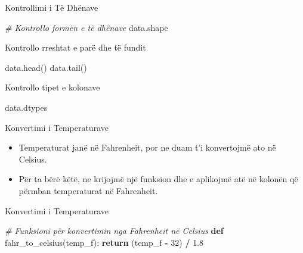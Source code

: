 \documentclass[
  ignorenonframetext,
]{beamer}
\newenvironment{Shaded}{\begin{snugshade}}{\end{snugshade}}
\newcommand{\CommentTok}[1]{\textcolor[rgb]{0.56,0.35,0.01}{\textit{#1}}}
\newcommand{\ControlFlowTok}[1]{\textcolor[rgb]{0.13,0.29,0.53}{\textbf{#1}}}
\newcommand{\DecValTok}[1]{\textcolor[rgb]{0.00,0.00,0.81}{#1}}
\newcommand{\FloatTok}[1]{\textcolor[rgb]{0.00,0.00,0.81}{#1}}
\newcommand{\KeywordTok}[1]{\textcolor[rgb]{0.13,0.29,0.53}{\textbf{#1}}}
\newcommand{\NormalTok}[1]{#1}
\newcommand{\OperatorTok}[1]{\textcolor[rgb]{0.81,0.36,0.00}{\textbf{#1}}}
\begin{document}
\begin{frame}[fragile]{Kontrollimi i Të Dhënave}
\protect\hypertarget{kontrollimi-i-tuxeb-dhuxebnave-1}{}
\begin{Shaded}
\begin{Highlighting}[]
\CommentTok{\# Kontrollo formën e të dhënave}
\NormalTok{data.shape}
\end{Highlighting}
\end{Shaded}
\end{frame}

\begin{frame}[fragile]{Kontrollo rreshtat e parë dhe të fundit}
\protect\hypertarget{kontrollo-rreshtat-e-paruxeb-dhe-tuxeb-fundit}{}
\begin{Shaded}
\begin{Highlighting}[]
\NormalTok{data.head()}
\NormalTok{data.tail()}
\end{Highlighting}
\end{Shaded}
\end{frame}

\begin{frame}[fragile]{Kontrollo tipet e kolonave}
\protect\hypertarget{kontrollo-tipet-e-kolonave}{}
\begin{Shaded}
\begin{Highlighting}[]
\NormalTok{data.dtypes}
\end{Highlighting}
\end{Shaded}
\end{frame}

\begin{frame}{Konvertimi i Temperaturave}
\protect\hypertarget{konvertimi-i-temperaturave}{}
\begin{itemize}
\item
  Temperaturat janë në Fahrenheit, por ne duam t'i konvertojmë ato në
  Celsius.
\item
  Për ta bërë këtë, ne krijojmë një funksion dhe e aplikojmë atë në
  kolonën që përmban temperaturat në Fahrenheit.
\end{itemize}
\end{frame}

\begin{frame}[fragile]{Konvertimi i Temperaturave}
\protect\hypertarget{konvertimi-i-temperaturave-1}{}
\begin{Shaded}
\begin{Highlighting}[]
\CommentTok{\# Funksioni për konvertimin nga Fahrenheit në Celsius}
\KeywordTok{def}\NormalTok{ fahr\_to\_celsius(temp\_f):}
    \ControlFlowTok{return}\NormalTok{ (temp\_f }\OperatorTok{{-}} \DecValTok{32}\NormalTok{) }\OperatorTok{/} \FloatTok{1.8}
\end{Highlighting}
\end{Shaded}
\end{frame}
\end{document}

